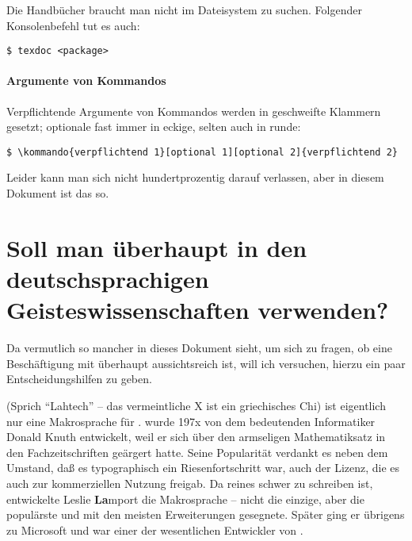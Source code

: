 \documentclass[
	11pt,        %
	table,       %
	twoside,     %
	notitlepage, %
]{scrreprt}
\begin{document}
Die Handbücher braucht man nicht im Dateisystem zu suchen. Folgender Konsolenbefehl tut es auch:
\begin{lstlisting}
$ texdoc <package>
\end{lstlisting}

\paragraph{Argumente von Kommandos}
Verpflichtende Argumente von Kommandos werden in geschweifte Klammern gesetzt; optionale fast immer in eckige, selten auch in runde:
\begin{lstlisting}
$ \kommando{verpflichtend 1}[optional 1][optional 2]{verpflichtend 2}
\end{lstlisting}
Leider kann man sich nicht hundertprozentig darauf verlassen, aber in diesem Dokument ist das so.

\section{Soll man \LaTeXi{} überhaupt in den deutschsprachigen Geisteswissenschaften verwenden?}

Da vermutlich so mancher in dieses Dokument sieht, um sich zu fragen, ob eine Beschäftigung mit \LaTeXi{} überhaupt aussichtsreich ist, will ich versuchen, hierzu ein paar Entscheidungshilfen zu geben.

\LaTeXi{} (Sprich \enquote{Lahtech} -- das vermeintliche X ist ein griechisches Chi) ist eigentlich nur eine Makrosprache für \TeXi{}. \TeXi{} wurde 197x von dem bedeutenden Informatiker Donald Knuth entwickelt, weil er sich über den armseligen Mathematiksatz in den Fachzeitschriften geärgert hatte. Seine Popularität verdankt es neben dem Umstand, daß es typographisch ein Riesenfortschritt war, auch der Lizenz, die es auch zur kommerziellen Nutzung freigab. Da reines \TeXi{} schwer zu schreiben ist, entwickelte Leslie \textbf{La}mport die Makrosprache \LaTeXi{} -- nicht die einzige, aber die populärste und mit den meisten Erweiterungen gesegnete. Später ging er übrigens zu Microsoft und war einer der wesentlichen Entwickler von .
\end{document}
